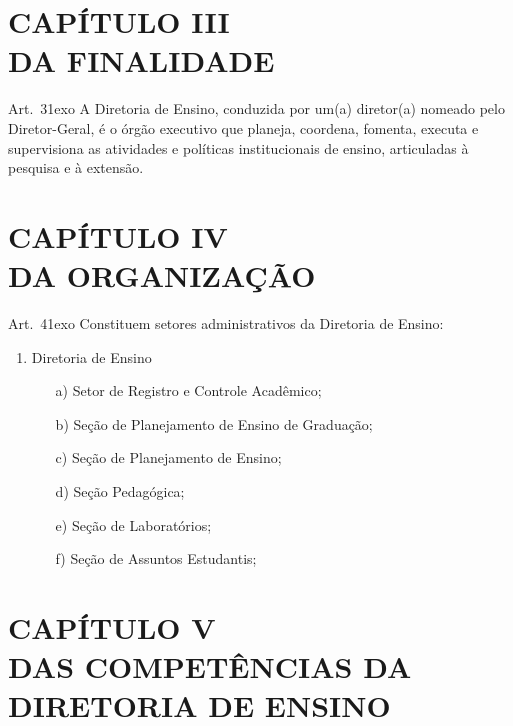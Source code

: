 \documentclass[a4paper,12pt]{report}
\newcommand{\ORD}[2]{#1\raise1ex\hbox{\scriptsize#2}}
\begin{document}
\section{CAPÍTULO III \\ DA FINALIDADE}

Art.~\ORD{3}{o} A Diretoria de Ensino, conduzida por um(a) diretor(a) nomeado pelo Diretor-Geral, é o órgão executivo que planeja, coordena, fomenta, executa e supervisiona as atividades e políticas institucionais de ensino, articuladas à pesquisa e à extensão.


\section{CAPÍTULO IV \\ DA ORGANIZAÇÃO}

Art.~\ORD{4}{o} Constituem setores administrativos da Diretoria de Ensino:

\begin{enumerate}
	\renewcommand{\labelenumi}{\Roman{enumi}}
	
	\item Diretoria de Ensino
	
	\begin{enumerate}
		\item[a)] Setor de Registro e Controle Acadêmico;
		\item[b)] Seção de Planejamento de Ensino de Graduação;
		\item[c)] Seção de Planejamento de Ensino;
		\item[d)] Seção Pedagógica;
		\item[e)] Seção de Laboratórios;
		\item[f)] Seção de Assuntos Estudantis;
	\end{enumerate}   
\end{enumerate}


\section{CAPÍTULO V \\ DAS COMPETÊNCIAS DA DIRETORIA DE ENSINO}
\end{document}
